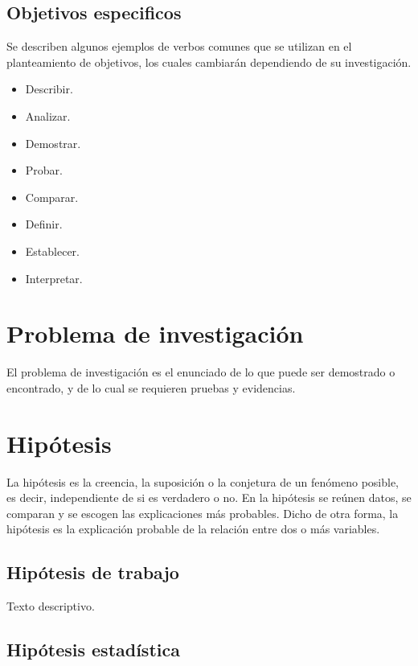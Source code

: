 \subsection{Objetivos especificos}

Se describen algunos ejemplos de verbos comunes que se utilizan en el planteamiento de objetivos, los cuales cambiarán dependiendo de su investigación.

\begin{itemize}
    \item Describir.
    \item Analizar.
    \item Demostrar.
    \item Probar.
    \item Comparar.
    \item Definir.
    \item Establecer.
    \item Interpretar.
\end{itemize}

\newpage
\section{Problema de investigación}

El problema de investigación es el enunciado de lo que puede ser demostrado o encontrado, y de lo cual se requieren pruebas y evidencias.

\newpage
\section{Hipótesis}

La hipótesis es la creencia, la suposición o la conjetura de un fenómeno posible, es decir, independiente de si es verdadero o no. En la hipótesis se reúnen datos, se comparan y se escogen las explicaciones más probables. Dicho de otra forma, la hipótesis es la explicación probable de la relación entre dos o más variables.

    \subsection{Hipótesis de trabajo}

    Texto descriptivo.

    \subsection{Hipótesis estadística}

